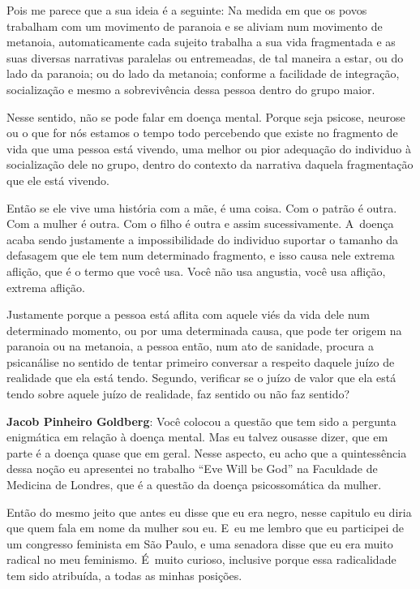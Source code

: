 Pois me parece que a sua ideia é a seguinte: Na medida em que os povos
trabalham com um movimento de paranoia e se aliviam num movimento de
metanoia, automaticamente cada sujeito trabalha a sua vida fragmentada
e as suas diversas narrativas paralelas ou entremeadas, de tal maneira a
estar, ou do lado da paranoia; ou do lado da metanoia; conforme a
facilidade de integração, socialização e mesmo a sobrevivência dessa
pessoa dentro do grupo maior.

Nesse sentido, não se pode falar em doença mental. Porque seja psicose,
neurose ou o que for nós estamos o tempo todo percebendo que existe no
fragmento de vida que uma pessoa está vivendo, uma melhor ou pior
adequação do individuo à socialização dele no grupo, dentro do contexto
da narrativa daquela fragmentação que ele está vivendo.

 

Então se ele vive uma história com a mãe, é uma coisa. Com o patrão é
outra. Com a mulher é outra. Com o filho é outra e assim sucessivamente.
A~doença acaba sendo justamente a impossibilidade do individuo suportar
o tamanho da defasagem que ele tem num determinado fragmento, e isso
causa nele extrema aflição, que é o termo que você usa. Você não usa
angustia, você usa aflição, extrema aflição.

 

Justamente porque a pessoa está aflita com aquele viés da vida dele num
determinado momento, ou por uma determinada causa, que pode ter origem
na paranoia ou na metanoia, a pessoa então, num ato de sanidade, procura
a psicanálise no sentido de tentar primeiro conversar a respeito daquele
juízo de realidade que ela está tendo. Segundo, verificar se o juízo de
valor que ela está tendo sobre aquele juízo de realidade, faz sentido ou
não faz sentido?

 

\textbf{Jacob Pinheiro Goldberg}: Você colocou a questão que tem sido a
pergunta enigmática em relação à doença mental. Mas eu talvez ousasse
dizer, que em parte é a doença quase que em geral. Nesse aspecto, eu
acho que a quintessência dessa noção eu apresentei no trabalho ``Eve
Will be God'' na Faculdade de Medicina de Londres, que é a questão da
doença psicossomática da mulher.

 

Então do mesmo jeito que antes eu disse que eu era negro, nesse capitulo
eu diria que quem fala em nome da mulher sou eu. E~eu me lembro que eu
participei de um congresso feminista em São Paulo, e uma senadora disse
que eu era muito radical no meu feminismo. É~muito curioso, inclusive
porque essa radicalidade tem sido atribuída, a todas as minhas posições.

